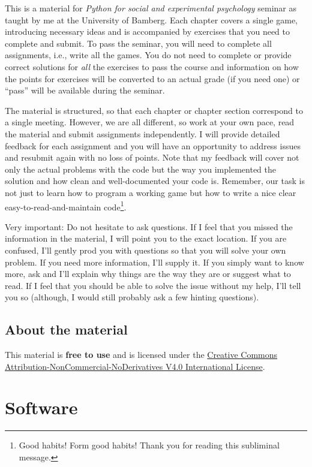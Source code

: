 \documentclass[
]{book}
\begin{document}
This is a material for \emph{Python for social and experimental psychology} seminar as taught by me at the University of Bamberg. Each chapter covers a single game, introducing necessary ideas and is accompanied by exercises that you need to complete and submit. To pass the seminar, you will need to complete all assignments, i.e., write all the games. You do not need to complete or provide correct solutions for \emph{all} the exercises to pass the course and information on how the points for exercises will be converted to an actual grade (if you need one) or ``pass'' will be available during the seminar.

The material is structured, so that each chapter or chapter section correspond to a single meeting. However, we are all different, so work at your own pace, read the material and submit assignments independently. I will provide detailed feedback for each assignment and you will have an opportunity to address issues and resubmit again with no loss of points. Note that my feedback will cover not only the actual problems with the code but the way you implemented the solution and how clean and well-documented your code is. Remember, our task is not just to learn how to program a working game but how to write a nice clear easy-to-read-and-maintain code\footnote{Good habits! Form good habits! Thank you for reading this subliminal message.}.

Very important: Do not hesitate to ask questions. If I feel that you missed the information in the material, I will point you to the exact location. If you are confused, I'll gently prod you with questions so that you will solve your own problem. If you need more information, I'll supply it. If you simply want to know more, ask and I'll explain why things are the way they are or suggest what to read. If I feel that you should be able to solve the issue without my help, I'll tell you so (although, I would still probably ask a few hinting questions).

\hypertarget{about-the-material}{%
\section{About the material}\label{about-the-material}}

This material is \textbf{free to use} and is licensed under the \href{https://creativecommons.org/licenses/by-nc-nd/4.0/}{Creative Commons Attribution-NonCommercial-NoDerivatives V4.0 International License}.

\hypertarget{software}{%
\chapter{Software}\label{software}}
\end{document}
